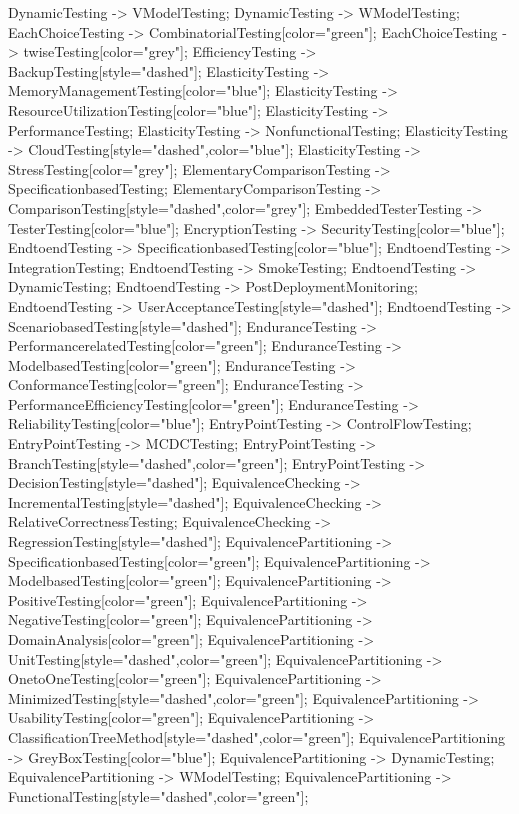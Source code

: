 \documentclass{article}
\begin{document}
{DynamicTesting -> VModelTesting;
DynamicTesting -> WModelTesting;
EachChoiceTesting -> CombinatorialTesting[color="green"];
EachChoiceTesting -> twiseTesting[color="grey"];
EfficiencyTesting -> BackupTesting[style="dashed"];
ElasticityTesting -> MemoryManagementTesting[color="blue"];
ElasticityTesting -> ResourceUtilizationTesting[color="blue"];
ElasticityTesting -> PerformanceTesting;
ElasticityTesting -> NonfunctionalTesting;
ElasticityTesting -> CloudTesting[style="dashed",color="blue"];
ElasticityTesting -> StressTesting[color="grey"];
ElementaryComparisonTesting -> SpecificationbasedTesting;
ElementaryComparisonTesting -> ComparisonTesting[style="dashed",color="grey"];
EmbeddedTesterTesting -> TesterTesting[color="blue"];
EncryptionTesting -> SecurityTesting[color="blue"];
EndtoendTesting -> SpecificationbasedTesting[color="blue"];
EndtoendTesting -> IntegrationTesting;
EndtoendTesting -> SmokeTesting;
EndtoendTesting -> DynamicTesting;
EndtoendTesting -> PostDeploymentMonitoring;
EndtoendTesting -> UserAcceptanceTesting[style="dashed"];
EndtoendTesting -> ScenariobasedTesting[style="dashed"];
EnduranceTesting -> PerformancerelatedTesting[color="green"];
EnduranceTesting -> ModelbasedTesting[color="green"];
EnduranceTesting -> ConformanceTesting[color="green"];
EnduranceTesting -> PerformanceEfficiencyTesting[color="green"];
EnduranceTesting -> ReliabilityTesting[color="blue"];
EntryPointTesting -> ControlFlowTesting;
EntryPointTesting -> MCDCTesting;
EntryPointTesting -> BranchTesting[style="dashed",color="green"];
EntryPointTesting -> DecisionTesting[style="dashed"];
EquivalenceChecking -> IncrementalTesting[style="dashed"];
EquivalenceChecking -> RelativeCorrectnessTesting;
EquivalenceChecking -> RegressionTesting[style="dashed"];
EquivalencePartitioning -> SpecificationbasedTesting[color="green"];
EquivalencePartitioning -> ModelbasedTesting[color="green"];
EquivalencePartitioning -> PositiveTesting[color="green"];
EquivalencePartitioning -> NegativeTesting[color="green"];
EquivalencePartitioning -> DomainAnalysis[color="green"];
EquivalencePartitioning -> UnitTesting[style="dashed",color="green"];
EquivalencePartitioning -> OnetoOneTesting[color="green"];
EquivalencePartitioning -> MinimizedTesting[style="dashed",color="green"];
EquivalencePartitioning -> UsabilityTesting[color="green"];
EquivalencePartitioning -> ClassificationTreeMethod[style="dashed",color="green"];
EquivalencePartitioning -> GreyBoxTesting[color="blue"];
EquivalencePartitioning -> DynamicTesting;
EquivalencePartitioning -> WModelTesting;
EquivalencePartitioning -> FunctionalTesting[style="dashed",color="green"];
}
\end{document}
